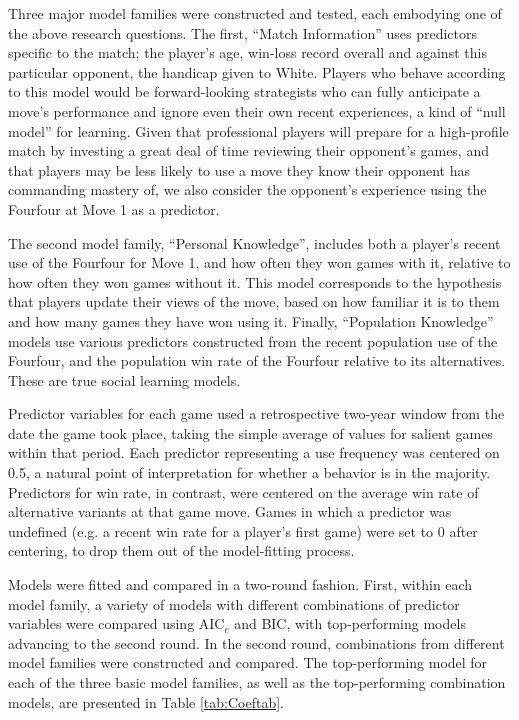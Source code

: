 Three major model families were constructed and tested, each embodying one of the above research questions.  The first, ``Match Information'' uses predictors specific to the match; the player's age, win-loss record overall and against this particular opponent, the handicap given to White.  Players who behave according to this model would be forward-looking strategists who can fully anticipate a move's performance and ignore even their own recent experiences, a kind of ``null model'' for learning.  Given that professional players will prepare for a high-profile match by investing a great deal of time reviewing their opponent's games, and that players may be less likely to use a move they know their opponent has commanding mastery of, we also consider the opponent's experience using the Fourfour at Move 1 as a predictor.  

The second model family, ``Personal Knowledge'', includes both a player's recent use of the Fourfour for Move 1, and how often they won games with it, relative to how often they won games without it.  This model corresponds to the hypothesis that players update their views of the move, based on how familiar it is to them and how many games they have won using it.  Finally, ``Population Knowledge'' models use various predictors constructed from the recent population use of the Fourfour, and the population win rate of the Fourfour relative to its alternatives.  These are true social learning models. 

Predictor variables for each game used a retrospective two-year window from the date the game took place, taking the simple average of values for salient games within that period.  Each predictor representing a use frequency was centered on 0.5, a natural point of interpretation for whether a behavior is in the majority.  Predictors for win rate, in contrast, were centered on the average win rate of alternative variants at that game move.  Games in which a predictor was undefined (e.g. a recent win rate for a player's first game) were set to 0 after centering, to drop them out of the model-fitting process.   

Models were fitted and compared in a two-round fashion.  First, within each model family, a variety of models with different combinations of predictor variables were compared using AIC$_c$ and BIC, with top-performing models advancing to the second round.  In the second round, combinations from different model families were constructed and compared.  The top-performing model for each of the three basic model families, as well as the top-performing combination models, are presented in Table \ref{tab:Coeftab}.  


